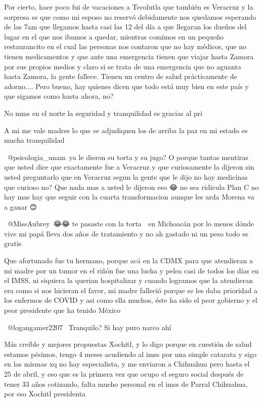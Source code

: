 Por cierto, hace poco fui de vacaciones a Tecolutla que también es Veracruz y la sorpresa es que como mi esposo no reservó debidamente nos quedamos esperando de las 7am que llegamos hasta casi las 12 del día a que llegaran los dueños del lugar en el que nos ibamos a quedar, mientras comimos en un pequeño restaurancito en el cual las personas nos contaron que no hay médicos, que no tienen medicamentos y que ante una emergencia tienen que viajar hasta Zamora por sus propios medios y claro si se trata de una emergencia que no aguanta hasta Zamora, la gente fallece. Tienen un centro de salud prácticamente de adorno.... Pero bueno, hay quienes dicen que todo está muy bien en este país y que sigamos como hasta ahora, no?

No mms en el norte la seguridad y tranquilidad es gracias al pri

A mi me vale madres lo que se adjudiquen los de arriba la paz en mi estado es mucha tranquilidad

​ @psicologia_unam ya le dieron su torta y su jugo? O porque tantas mentiras que usted dice que exactamente fue a Veracruz y que curiosamente la dijeron sin usted preguntarlo que en Veracruz segun la gente que le dijo no hay medicinas que curioso no? Que nada mas a usted le dijeron eso 😂 no sea ridicula Plan C no hay mas hay que seguir con la cuarta transformacion aunque les arda Morena va a ganar 😊

​ @MissAubrey 😂😂 te pasaste con la torta  🤣 en Michoacán por lo menos dónde vive mi papá lleva dos años de tratamiento y no ah gastado ni un peso todo es gratis

Que afortunado fue tu hermano, porque acá en la CDMX para que atendieran a mi madre por un tumor en el riñón fue una lucha y pelea casi de todos los días en el IMSS, ni siquiera la querian hospitalizar y cuando logramos que la atendieran era como si nos hicieran el favor, mi madre falleció porque se les daba prioridad a los enfermos de COVID y asi como ella muchos, éste ha sido el peor gobierno y el peor presidente que ha tenido México

 @logangamer2207  Tranquilo? Si hay puro narco ahí

Más creíble y mejores propuestas Xochitl, y lo digo porque en cuestión de salud estamos pésimos, tengo 4 meses acudiendo al imss por una simple catarata y sigo en las mismas xq no hay especialista, y me enviaron a Chihuahua pero hasta el 25 de abril, y eso que es la primera vez que ocupo el seguro social después de tener 33 años cotizando, falta mucho personal en el imss de Parral Chihuahua,  por eso Xochitl presidenta

